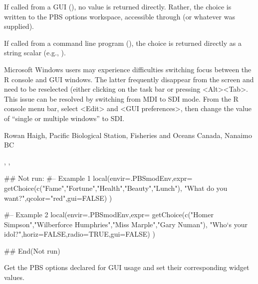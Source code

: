 \documentclass[letterpaper]{book}
\begin{document}
%
\begin{Value}
If called from a GUI (), no value is returned directly. Rather, 
the choice is written to the PBS options workspace, accessible through 
 (or whatever  was supplied).

If called from a command line program (), the choice is returned 
directly as a string scalar (e.g.,  ). 

\end{Value}
%
\begin{Note}\relax
 
Microsoft Windows users may experience difficulties switching focus between the 
R console and GUI windows. The latter frequently disappear from the screen and 
need to be reselected (either clicking on the task bar or pressing <Alt><Tab>. 
This issue can be resolved by switching from MDI to SDI mode. From the R console 
menu bar, select <Edit> and <GUI preferences>, then change the value of 
``single or multiple windows'' to SDI.
\end{Note}
%
\begin{Author}\relax
Rowan Haigh, Pacific Biological Station, Fisheries and Oceans Canada, Nanaimo BC
\end{Author}
%
\begin{SeeAlso}\relax
 
, , 
\end{SeeAlso}
%
\begin{Examples}
\begin{ExampleCode}
## Not run: 
#-- Example 1
local(envir=.PBSmodEnv,expr={
  getChoice(c("Fame","Fortune","Health","Beauty","Lunch"),
    "What do you want?",qcolor="red",gui=FALSE)
})

#-- Example 2
local(envir=.PBSmodEnv,expr={
  getChoice(c("Homer Simpson","Wilberforce Humphries","Miss Marple","Gary Numan"),
    "Who`s your idol?",horiz=FALSE,radio=TRUE,gui=FALSE)
})

## End(Not run)
\end{ExampleCode}
\end{Examples}
%
\begin{Description}\relax
Get the PBS options declared for GUI usage and set their 
corresponding widget values.
\end{Description}
\end{document}
